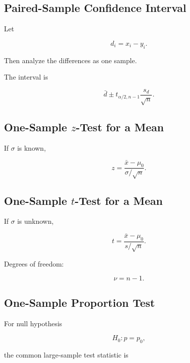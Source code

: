 \subsection{Paired-Sample Confidence Interval}
\label{subsec:paired-confidence-interval}

Let

\[
d_i
=
x_i-y_i.
\]

Then analyze the differences as one sample.

The interval is

\[
\boxed{
\bar d
\pm
t_{\alpha/2,n-1}
\frac{
s_d
}{
\sqrt n
}.
}
\]

\subsection{One-Sample \(z\)-Test for a Mean}
\label{subsec:one-sample-z-test-mean}

If \(\sigma\) is known,

\[
\boxed{
z
=
\frac{
\bar{x}-\mu_0
}{
\sigma/\sqrt n
}.
}
\]

\subsection{One-Sample \(t\)-Test for a Mean}
\label{subsec:one-sample-t-test-mean}

If \(\sigma\) is unknown,

\[
\boxed{
t
=
\frac{
\bar{x}-\mu_0
}{
s/\sqrt n
}.
}
\]

Degrees of freedom:

\[
\boxed{
\nu=n-1.
}
\]

\subsection{One-Sample Proportion Test}
\label{subsec:one-sample-proportion-test}

For null hypothesis

\[
H_0:p=p_0,
\]

the common large-sample test statistic is


